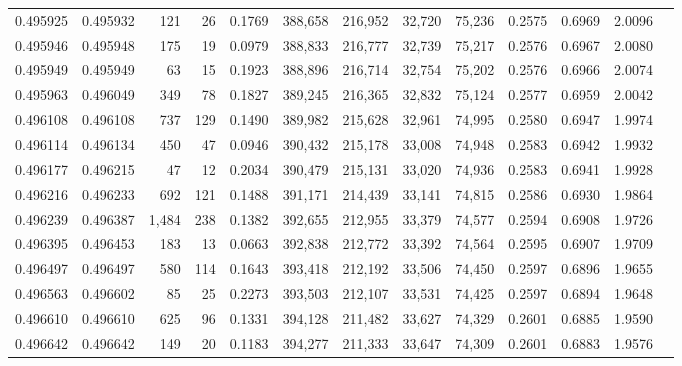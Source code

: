 \begin{tabular}{rrrrrrrrrrrrr}
0.495925 & 0.495932 &   121 &    26 &                                     0.1769 & 388,658 & 216,952 &  32,720 &  75,236 & 0.2575 & 0.6969 & 2.0096 \\
0.495946 & 0.495948 &   175 &    19 &                                     0.0979 & 388,833 & 216,777 &  32,739 &  75,217 & 0.2576 & 0.6967 & 2.0080 \\
0.495949 & 0.495949 &    63 &    15 &                                     0.1923 & 388,896 & 216,714 &  32,754 &  75,202 & 0.2576 & 0.6966 & 2.0074 \\
0.495963 & 0.496049 &   349 &    78 &                                     0.1827 & 389,245 & 216,365 &  32,832 &  75,124 & 0.2577 & 0.6959 & 2.0042 \\
0.496108 & 0.496108 &   737 &   129 &                                     0.1490 & 389,982 & 215,628 &  32,961 &  74,995 & 0.2580 & 0.6947 & 1.9974 \\
0.496114 & 0.496134 &   450 &    47 &                                     0.0946 & 390,432 & 215,178 &  33,008 &  74,948 & 0.2583 & 0.6942 & 1.9932 \\
0.496177 & 0.496215 &    47 &    12 &                                     0.2034 & 390,479 & 215,131 &  33,020 &  74,936 & 0.2583 & 0.6941 & 1.9928 \\
0.496216 & 0.496233 &   692 &   121 &                                     0.1488 & 391,171 & 214,439 &  33,141 &  74,815 & 0.2586 & 0.6930 & 1.9864 \\
0.496239 & 0.496387 & 1,484 &   238 &                                     0.1382 & 392,655 & 212,955 &  33,379 &  74,577 & 0.2594 & 0.6908 & 1.9726 \\
0.496395 & 0.496453 &   183 &    13 &                                     0.0663 & 392,838 & 212,772 &  33,392 &  74,564 & 0.2595 & 0.6907 & 1.9709 \\
0.496497 & 0.496497 &   580 &   114 &                                     0.1643 & 393,418 & 212,192 &  33,506 &  74,450 & 0.2597 & 0.6896 & 1.9655 \\
0.496563 & 0.496602 &    85 &    25 &                                     0.2273 & 393,503 & 212,107 &  33,531 &  74,425 & 0.2597 & 0.6894 & 1.9648 \\
0.496610 & 0.496610 &   625 &    96 &                                     0.1331 & 394,128 & 211,482 &  33,627 &  74,329 & 0.2601 & 0.6885 & 1.9590 \\
0.496642 & 0.496642 &   149 &    20 &                                     0.1183 & 394,277 & 211,333 &  33,647 &  74,309 & 0.2601 & 0.6883 & 1.9576 \\

\end{tabular}
